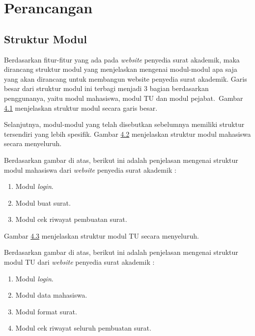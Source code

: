 \chapter{Perancangan}
\label{chap:perancangan}

\section{Struktur Modul}
\label{sec:struktur_modul}
Berdasarkan fitur-fitur yang ada pada \textit{website} penyedia surat akademik, maka dirancang struktur modul yang menjelaskan mengenai modul-modul apa saja yang akan dirancang untuk membangun website penyedia surat akademik. Garis besar dari struktur modul ini terbagi menjadi 3 bagian berdasarkan penggunanya, yaitu modul mahasiswa, modul TU dan modul pejabat.\
Gambar \hyperlink{struktur_modul_garis_besar}{4.1} menjelaskan struktur modul secara garis besar.



Selanjutnya, modul-modul yang telah disebutkan sebelumnya memiliki struktur tersendiri yang lebih spesifik. Gambar \hyperlink{struktur_modul_mahasiswa}{4.2} menjelaskan struktur modul mahasiswa secara menyeluruh.



Berdasarkan gambar di atas, berikut ini adalah penjelasan mengenai struktur modul mahasiswa dari \textit{website} penyedia surat akademik :
\begin{enumerate}
	\item Modul \textit{login}.
	\item Modul buat surat.
	\item Modul cek riwayat pembuatan surat.
\end{enumerate}

Gambar \hyperlink{struktur_modul_tu}{4.3} menjelaskan struktur modul TU secara menyeluruh.


Berdasarkan gambar di atas, berikut ini adalah penjelasan mengenai struktur modul TU dari \textit{website} penyedia surat akademik :
\begin{enumerate}
	\item Modul \textit{login}.
	\item Modul data mahasiswa.
	\item Modul format surat.
	\item Modul cek riwayat seluruh pembuatan surat.
\end{enumerate}

